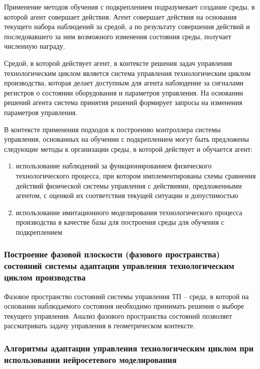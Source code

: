 Применение методов обучения с подкреплением подразумевает создание среды, в которой агент совершает действия. Агент совершает действия на основания текущего набора наблюдений за средой, а по результату совершения действий и последовавшего за ним возможного изменения состояния среды, получает численную награду.


Средой, в которой действует агент, в контексте решения задач управления технологическим циклом является система управления технологическим циклом производства, которая делает доступным для агента наблюдение за сигналами регистров о состоянии оборудования и параметров управления. На основании решений агента система принятия решений формирует запросы на изменения параметров управления.


В контексте применения подходов к построению контроллера системы управления, основанных на обучении с подкреплением могут быть предложены следующие методы к организации среды, в которой действует и обучается агент:

\begin{enumerate}
    \item использование наблюдений за функционированием физического технологического процесса, при котором имплементированы схемы сравнения действий физической системы управления с действиями, предложенными агентом, с оценкой их соответствия текущей ситуации и допустимостью
    \item использование имитационного моделирования технологического процесса производства в качестве базы для построения среды для обучения с подкреплением
\end{enumerate}



\subsubsection{Построение фазовой плоскости (фазового пространства) состояний системы адаптации управления технологическим циклом производства}

Фазовое пространство состояний системы управления ТП – среда, в которой на основании наблюдаемого состояния необходимо принимать решения о выборе текущего управления. Анализ фазового пространства состояний позволяет рассматривать задачу управления в геометрическом контексте. 


\subsubsection{Алгоритмы адаптации управления технологическим циклом при использовании нейросетевого моделирования}

